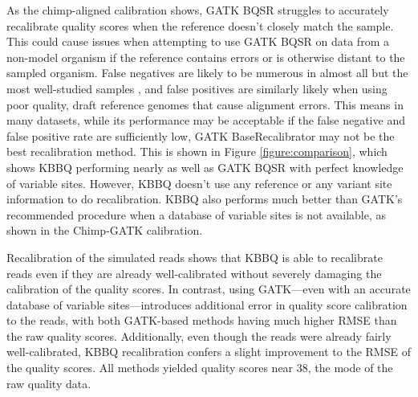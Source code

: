 As the chimp-aligned calibration shows, GATK BQSR struggles to accurately recalibrate quality scores when the reference doesn't closely match the sample. This could cause issues when attempting to use GATK BQSR on data from a non-model organism if the reference contains errors or is otherwise distant to the sampled organism. False negatives are likely to be numerous in almost all but the most well-studied samples \parencite{bobo_false_2016}, and false positives are similarly likely when using poor quality, draft reference genomes that cause alignment errors. This means in many datasets, while its performance may be acceptable if the false negative and false positive rate are sufficiently low, GATK BaseRecalibrator may not be the best recalibration method. This is shown in Figure \ref{figure:comparison}, which shows KBBQ performing nearly as well as GATK BQSR with perfect knowledge of variable sites. However, KBBQ doesn't use any reference or any variant site information to do recalibration. KBBQ also performs much better than GATK's recommended procedure when a database of variable sites is not available, as shown in the Chimp-GATK calibration.

Recalibration of the simulated reads shows that KBBQ is able to recalibrate reads even if they are already well-calibrated without severely damaging the calibration of the quality scores. In contrast, using GATK---even with an accurate database of variable sites---introduces additional error in quality score calibration to the reads, with both GATK-based methods having much higher RMSE than the raw quality scores. Additionally, even though the reads were already fairly well-calibrated, KBBQ recalibration confers a slight improvement to the RMSE of the quality scores. All methods yielded quality scores near 38, the mode of the raw quality data.

